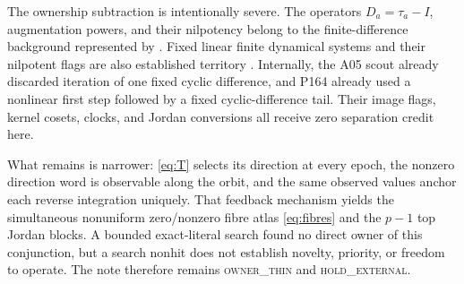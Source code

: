 \documentclass[a4paper,10pt]{amsart}
\theoremstyle{remark}
\begin{document}
The ownership subtraction is intentionally severe.  The operators
$D_a=\tau_a-I$, augmentation powers, and their nilpotency belong to the
finite-difference background represented by \cite{AichingerMoosbauer2021}.
Fixed linear finite dynamical systems and their nilpotent flags are also
established territory \cite{HernandezToledo2005}.  Internally, the A05 scout
already discarded iteration of one fixed cyclic difference, and P164
already used a nonlinear first step followed by a fixed cyclic-difference
tail.  Their image flags, kernel cosets, clocks, and Jordan conversions all
receive zero separation credit here.

What remains is narrower: \eqref{eq:T} selects its direction at every epoch,
the nonzero direction word is observable along the orbit, and the same
observed values anchor each reverse integration uniquely.  That feedback
mechanism yields the simultaneous nonuniform zero/nonzero fibre atlas
\eqref{eq:fibres} and the $p-1$ top Jordan blocks.  A bounded exact-literal
search found no direct owner of this conjunction, but a search nonhit does
not establish novelty, priority, or freedom to operate.  The note therefore
remains \textsc{owner\_thin} and \textsc{hold\_external}.



\end{document}
